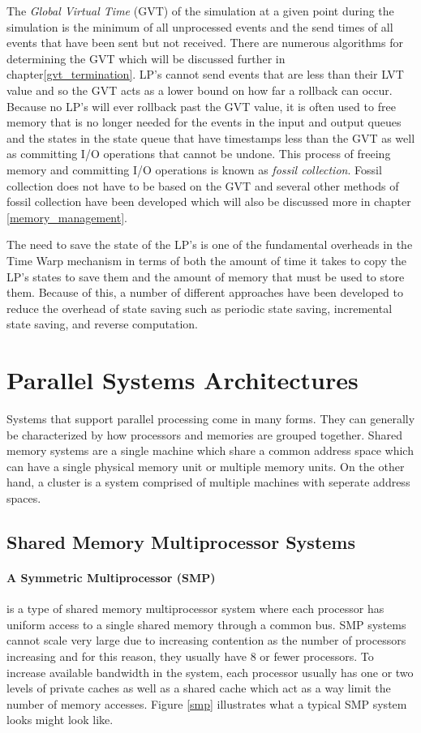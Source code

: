 \documentclass[11pt]{book}
\begin{document}
The \emph{Global Virtual Time} (GVT) of the simulation at a given point during the simulation
is the minimum of all unprocessed events and the send times of all events that have been
sent but not received\cite{jefferson-85}. There are numerous algorithms for determining
the GVT which will be discussed further in chapter\ref{gvt_termination}. LP's cannot send
events that are less than their LVT value and so the GVT acts as a lower bound on how far
a rollback can occur. Because no LP's will ever rollback past the GVT value, it is often
used to free memory that is no longer needed for the events in the input and output queues
and the states in the state queue that have timestamps less than the GVT as well as committing
I/O operations that cannot be undone. This process of freeing memory and committing I/O
operations is known as \emph{fossil collection}. Fossil collection does not have to be based
on the GVT and several other methods of fossil collection have been developed which will
also be discussed more in chapter \ref{memory_management}.

The need to save the state of the LP's is one of the fundamental overheads in the Time Warp
mechanism in terms of both the amount of time it takes to copy the LP's states to save them
and the amount of memory that must be used to store them. Because of this, a number of
different approaches have been developed to reduce the overhead of state saving such as
periodic state saving, incremental state saving, and reverse computation.

\section{Parallel Systems Architectures}

Systems that support parallel processing come in many forms. They can generally be
characterized by how processors and memories are grouped together. Shared memory
systems are a single machine which share a common address space which can have a single
physical memory unit or multiple memory units. On the other hand, a cluster is a system
comprised of multiple machines with seperate address spaces. 

\subsection{Shared Memory Multiprocessor Systems}

\paragraph{A Symmetric Multiprocessor (SMP)} is a type of shared memory multiprocessor
system where each processor has uniform access to a single shared memory through a common
bus. SMP systems cannot scale very large due to increasing contention as the number of
processors increasing and for this reason, they usually have 8 or fewer processors.
To increase available bandwidth in the system, each processor usually has one or two
levels of private caches as well as a shared cache which act as a way limit the number of
memory accesses. Figure \ref{smp} illustrates what a typical SMP system looks might look
like.
\end{document}
